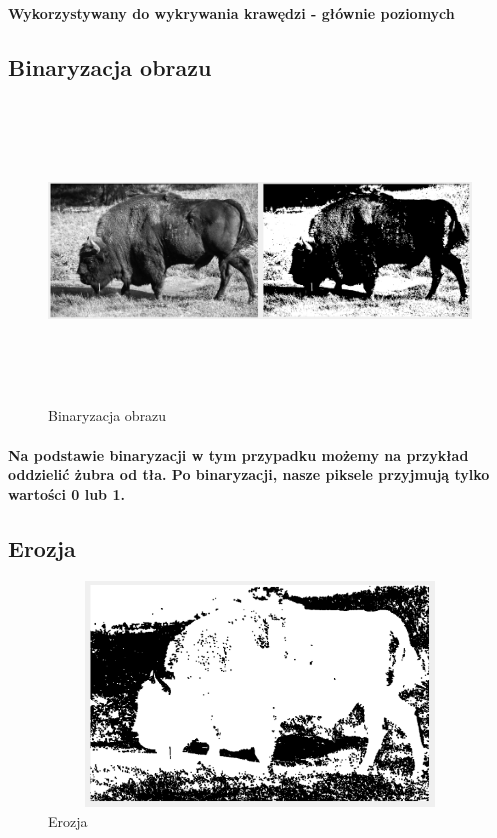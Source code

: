 \documentclass[a4paper,12pt]{article}
\begin{document}
\begin{justify}
\paragraph{Wykorzystywany do wykrywania krawędzi - głównie poziomych}

\newpage

\subsection{Binaryzacja obrazu}

\begin{figure}[h!]
\centering
\includegraphics[width=18cm, height=8cm]{10}
\caption{Binaryzacja obrazu}
\end{figure}

\paragraph{Na podstawie binaryzacji w tym przypadku możemy na przykład oddzielić żubra od tła. Po binaryzacji, nasze piksele przyjmują tylko wartości 0 lub 1.}

\newpage

\subsection{Erozja}

\begin{figure}[h!]
\centering
\includegraphics[width=12cm, height=6cm]{11}
\caption{Erozja}
\end{figure}


\end{justify}
\end{document}
